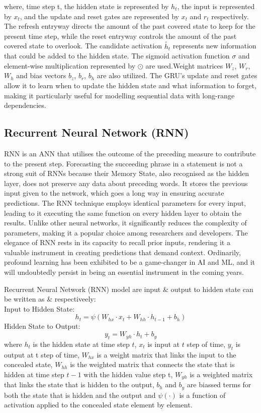 where,  time step t,  the hidden state is represented by $ h_t $,  the input is represented by $ x_t $,  and the update and reset gates are
represented by $ x_t $ and $ r_t$ respectively. The refresh entryway directs the amount of the past covered state to keep for the present time step,  while the reset entryway controls the amount of the past covered state to overlook. The candidate activation $\tilde{h_t}$ represents new information that could be added to the hidden state. The sigmoid activation function $ \sigma $ and element-wise multiplication represented by $\odot$ are used.Weight matrices $ W_z $,  $ W_r $,  $ W_h $ and bias vectors $ b_z $,  $ b_r $,  $ b_h $ are also utilized. The GRU's update and reset gates allow it to learn when to update the hidden state and what information to forget,  making it particularly useful for modelling sequential data with long-range dependencies.
\subsection{Recurrent Neural Network (RNN)}
RNN is an ANN that utilises the outcome of the preceding measure to contribute to the present step. Forecasting the succeeding phrase in a statement is not a strong suit of RNNs because their Memory State,  also recognised as the hidden layer,  does not preserve any data about preceding words. It stores the previous input given to the network,  which goes a long way in ensuring accurate predictions. The RNN technique employs identical parameters for every input,  leading to it executing the same function on every hidden layer to obtain the results. Unlike other neural networks, it significantly reduces the complexity of parameters,  making it a popular choice among researchers and developers. The elegance of RNN rests in its capacity to recall prior inputs,  rendering it a valuable instrument in creating predictions that demand context. Ordinarily,  profound learning has been exhibited to be a game-changer in AI and ML,  and it will undoubtedly persist in being an essential instrument in the coming years.

Recurrent Neural Network (RNN) model are input \& output to hidden state can be written as  \&  respectiveely: \\
Input to Hidden State:
  \begin{equation} \label{equ: ih rnn}
    h_t= \psi (W_{hx} \cdot x_t + W_{hh} \cdot h_{t-1} +b_h)
  \end{equation}
  Hidden State to Output: 
  \begin{equation} \label{equ: h rnn}
     y_t=W_{yh}\cdot h_t+b_y
  \end{equation}
where $h_t $ is the hidden state at time step $t$,  $x_t$ is input at $t$ step of time,  $y_t$ is output at t step of time,  $W_{hx} $ is a weight matrix that links the input to the concealed state,  $W_{hh}$ is the weighted matrix that connects the state that is hidden at time step $t-1$ with the hidden value step t,  $W_{yh}$ is a weighted matrix that links the state that is hidden to the output,  $b_h$ and $b_y$ are biassed terms for both the state that is hidden and the output and $\psi (\cdot)$ is a function of activation applied to the concealed state element by element.


